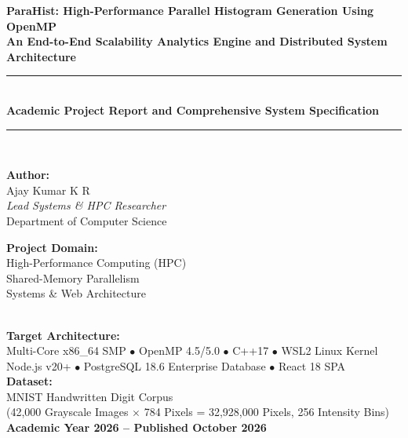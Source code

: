 \documentclass[12pt,a4paper,oneside]{report}
\begin{document}
\begin{titlepage}
    \centering
    \vspace*{0.5cm}
    
    {\Huge \textbf{ParaHist: High-Performance Parallel Histogram Generation Using OpenMP}}\\[0.6cm]
    {\LARGE \textbf{An End-to-End Scalability Analytics Engine and Distributed System Architecture}}\\[1.2cm]
    
    \rule{\linewidth}{1.5pt}\\[0.6cm]
    {\large \textbf{Academic Project Report and Comprehensive System Specification}}\\[0.3cm]
    \rule{\linewidth}{1.5pt}\\[2.0cm]
    
    \begin{minipage}{0.48\textwidth}
        \begin{flushleft} \large
            \textbf{Author:}\\
            Ajay Kumar K R\\
            \textit{Lead Systems \& HPC Researcher}\\
            Department of Computer Science
        \end{flushleft}
    \end{minipage}
    \begin{minipage}{0.48\textwidth}
        \begin{flushright} \large
            \textbf{Project Domain:}\\
            High-Performance Computing (HPC)\\
            Shared-Memory Parallelism\\
            Systems \& Web Architecture
        \end{flushright}
    \end{minipage}\\[2.5cm]
    
    \textbf{Target Architecture:}\\
    Multi-Core x86\_64 SMP $\bullet$ OpenMP 4.5/5.0 $\bullet$ C++17 $\bullet$ WSL2 Linux Kernel\\
    Node.js v20+ $\bullet$ PostgreSQL 18.6 Enterprise Database $\bullet$ React 18 SPA\\[1.5cm]
    
    \textbf{Dataset:}\\
    MNIST Handwritten Digit Corpus\\
    (42,000 Grayscale Images $\times$ 784 Pixels = 32,928,000 Pixels, 256 Intensity Bins)\\[1.5cm]
    
    \vfill
    {\large \textbf{Academic Year 2026 -- Published October 2026}}
\end{titlepage}
\end{document}
